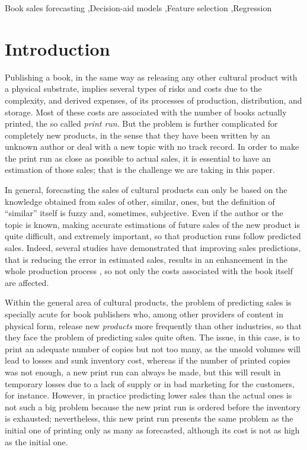 \documentclass[a4paper,10pt,twocolumn,preprint,3p]{elsarticle}
\begin{document}
\begin{frontmatter}
\begin{keyword}
Book sales forecasting \sep Decision-aid models \sep Feature selection \sep Regression  
\end{keyword}

\end{frontmatter}



\section{Introduction}

Publishing a book, in the same way as releasing any other cultural product with a physical substrate, implies several types of risks and costs due to
the complexity, and derived expenses, of its processes of production,
distribution, and storage. Most of these costs are associated
with the number of books actually printed, the so called {\em print run}. But the problem is further complicated for completely new products, in the sense that they have been written by an unknown author or deal with a new topic with no track record. In order to make the print run as close as possible to actual sales, it is essential to have an estimation of those sales; that is the challenge we are taking in this paper. 

In general, forecasting the sales of cultural products can
only be based on the knowledge obtained from sales of other, similar, ones,
but the definition of ``similar'' itself is fuzzy and, sometimes,
subjective. Even if the author or the topic is known, making accurate
estimations of future sales of the new product is quite difficult, and
extremely important, so that production runs follow predicted sales. 
Indeed, several studies have demonstrated that improving sales
predictions, that is reducing the error in estimated sales, results in an enhancement in the whole production process \cite{Fildes2010,Saeed2008}, so not only the costs associated with the book itself are affected.

Within the general area of cultural products, the problem of
predicting sales is specially acute for book publishers who, among other
providers of content in physical form, release new {\em products} more frequently than
other industries, so that they face the problem of predicting sales quite often. The issue, in this case, is to print an adequate number of copies but not too many, as the unsold volumes will lead to losses and sunk inventory cost, 
whereas if the number of printed copies was not enough, a new print
run can always be made, but this will result in temporary losses due to a lack of supply or in bad marketing for the customers, for instance. However, in practice predicting lower sales than the actual ones is not such a big problem because the new print run is ordered before the inventory is exhausted; nevertheless, this new print run presents the same problem as the
initial one of printing only as many as forecasted, although its cost
is not as high as the initial one.
\end{document}
